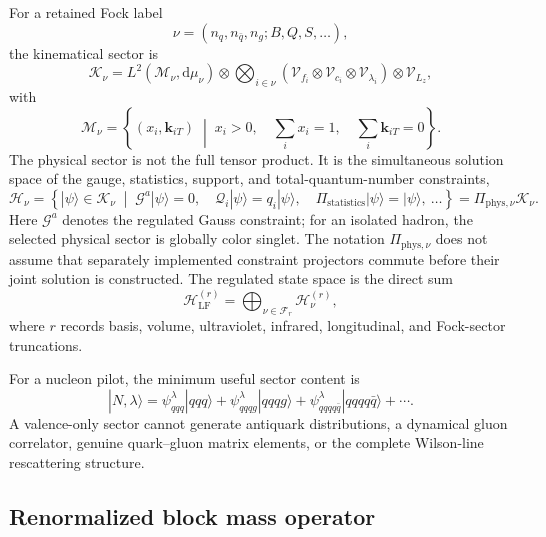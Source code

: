\documentclass[11pt]{article}
\newcommand{\dd}{\mathrm{d}}
\newcommand{\Hil}{\mathcal H}
\newcommand{\Kin}{\mathcal K}
\newcommand{\Rep}{\mathcal V}
\newcommand{\LF}{\mathrm{LF}}
\newcommand{\cM}{\mathcal M}
\newcommand{\cG}{\mathcal G}
\newcommand{\cQ}{\mathcal Q}
\begin{document}
For a retained Fock label
\begin{equation}
 \nu=(n_q,n_{\bar q},n_g;B,Q,S,\ldots),
\end{equation}
the kinematical sector is
\begin{equation}
 \Kin_\nu=
 L^2(\cM_\nu,\dd\mu_\nu)
 \otimes
 \bigotimes_{i\in\nu}
 \left(
 \Rep_{f_i}\otimes\Rep_{c_i}\otimes\Rep_{\lambda_i}
 \right)
 \otimes\Rep_{L_z},
\label{eq:kinematical-sector}
\end{equation}
with
\begin{equation}
 \cM_\nu=
 \left\{(x_i,\bm k_{iT})\;\middle|\;
 x_i>0,\quad
 \sum_i x_i=1,\quad
 \sum_i\bm k_{iT}=0
 \right\}.
\label{eq:momentum-simplex}
\end{equation}
The physical sector is not the full tensor product.  It is the simultaneous
solution space of the gauge, statistics, support, and total-quantum-number
constraints,
\begin{equation}
 \Hil_\nu=
 \left\{|\psi\rangle\in\Kin_\nu\;\middle|\;
 \cG^a|\psi\rangle=0,\quad
 \cQ_i|\psi\rangle=q_i|\psi\rangle,\quad
 \Pi_{\mathrm{statistics}}|\psi\rangle=|\psi\rangle,
 \ \ldots\right\}
 =\Pi_{\mathrm{phys},\nu}\Kin_\nu.
\label{eq:physical-sector}
\end{equation}
Here \(\cG^a\) denotes the regulated Gauss constraint; for an isolated hadron,
the selected physical sector is globally color singlet.  The notation
\(\Pi_{\mathrm{phys},\nu}\) does not assume that separately implemented
constraint projectors commute before their joint solution is constructed.
The regulated state space is the direct sum
\begin{equation}
 \Hil_{\LF}^{(r)}=
 \bigoplus_{\nu\in\mathcal F_r}\Hil_\nu^{(r)},
\label{eq:regulated-direct-sum}
\end{equation}
where \(r\) records basis, volume, ultraviolet, infrared, longitudinal, and
Fock-sector truncations.

For a nucleon pilot, the minimum useful sector content is
\begin{equation}
 |N,\lambda\rangle=
 \psi_{qqq}^{\lambda}|qqq\rangle
 +\psi_{qqqg}^{\lambda}|qqqg\rangle
 +\psi_{qqqq\bar q}^{\lambda}|qqqq\bar q\rangle
 +\cdots.
\label{eq:nucleon-fock-expansion}
\end{equation}
A valence-only sector cannot generate antiquark distributions, a dynamical
gluon correlator, genuine quark--gluon matrix elements, or the complete
Wilson-line rescattering structure.

\subsection{Renormalized block mass operator}
\end{document}
